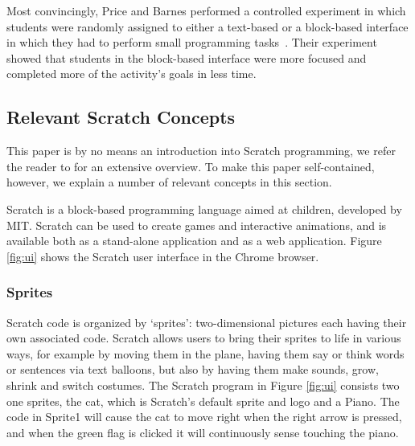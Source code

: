 \documentclass{sig-alternate}
\begin{document}
Most convincingly, Price and Barnes performed a controlled experiment in which students were randomly assigned to either a text-based or a block-based interface in  which they had to perform small programming tasks~\cite{price_comparing_2015}. Their experiment showed that students in the block-based interface were more focused and completed more of the activity's goals in less time.


\subsection{Relevant Scratch Concepts}
\label{sec:scratch}
This paper is by no means an introduction into Scratch programming, we refer the reader to \cite{brennan_creative_2014} for an extensive overview. To make this paper self-contained, however, we explain a number of relevant concepts in this section. 

Scratch is a block-based programming language aimed at children, developed by MIT. Scratch can be used to create games and interactive animations, and is available both as a stand-alone application and as a web application. Figure \ref{fig:ui} shows the Scratch user interface in the Chrome browser.

\subsubsection{Sprites}
Scratch code is organized by `sprites': two-dimensional pictures each having their own associated code. Scratch allows users to bring their sprites to life in various ways, for example by moving them in the plane, having them say or think words or sentences via text balloons, but also by having them make sounds, grow, shrink and switch costumes. The Scratch program in Figure \ref{fig:ui} consists two one sprites, the cat, which is Scratch's default sprite and logo and a Piano. The code in Sprite1 will cause the cat to move right when the right arrow is pressed, and when the green flag is clicked it will continuously sense touching the piano.
\end{document}
